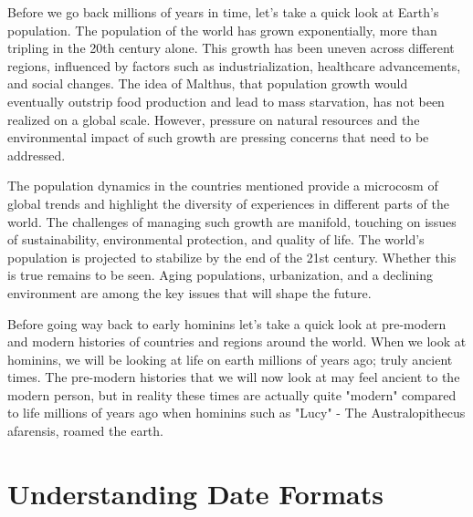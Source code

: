 \documentclass[a4paper,12pt]{book}
\newcommand{\inputtoc}[1]{}
\begin{document}




Before we go back millions of years in time, let's take a quick look at Earth's population. The population of the world has grown exponentially, more than tripling in the 20th century alone. This growth has been uneven across different regions, influenced by factors such as industrialization, healthcare advancements, and social changes. The idea of Malthus, that population growth would eventually outstrip food production and lead to mass starvation, has not been realized on a global scale. However, pressure on natural resources and the environmental impact of such growth are pressing concerns that need to be addressed.

\inputtoc{england.tex}
\inputtoc{germany.tex}
\inputtoc{turkey.tex}
\inputtoc{SouthAfrica.tex}
\inputtoc{brazil.tex}
\inputtoc{russia.tex}
\inputtoc{australia.tex}
\inputtoc{korea.tex}
\inputtoc{japan.tex}
\inputtoc{indonesia.tex}
\inputtoc{india.tex}
\inputtoc{china.tex}
\inputtoc{mexico.tex}
\inputtoc{canada.tex}
\inputtoc{usa.tex}

\let\section\oldsection

The population dynamics in the countries mentioned provide a microcosm of global trends and highlight the diversity of experiences in different parts of the world. The challenges of managing such growth are manifold, touching on issues of sustainability, environmental protection, and quality of life.  The world's population is projected to stabilize by the end of the 21st century. Whether this is true remains to be seen. Aging populations, urbanization, and a declining environment are among the key issues that will shape the future. 

Before going way back to early hominins let's take a quick look at pre-modern and modern histories of countries and regions around the world. When we look at hominins, we will be looking at life on earth millions of years ago; truly ancient times. The pre-modern histories that we will now look at may feel ancient to the modern person, but in reality these times are actually quite "modern" compared to life millions of years ago when hominins such as "Lucy" - The Australopithecus afarensis, roamed the earth. 

\chapter{Understanding Date Formats}
\end{document}

